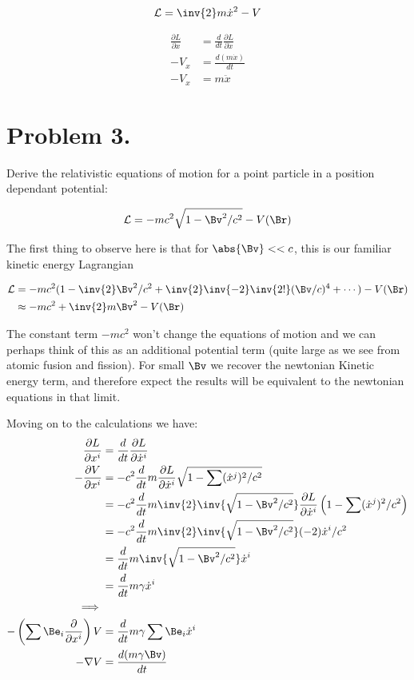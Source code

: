 \documentclass{article}
\newcommand{\grad}[0]{\nabla}
\newcommand{\LL}[0]{\mathcal{L}}
\newcommand{\xdot}[0]{\dot{x}}
\newcommand{\xddot}[0]{\ddot{x}}
\newcommand{\PD}[2]{\frac{\partial {#2}}{\partial {#1}}}
\begin{document}
\begin{equation*}
\LL = \inv{2}m \xdot^2 - V
\end{equation*}

\begin{align*}
\frac{\partial L}{\partial x} &= \frac{d}{dt} \frac{\partial L}{\partial \xdot} \\
-V_x &= \frac{d (m \xdot) }{dt} \\
-V_x &= m \xddot
\end{align*}

\section{ Problem 3. }

Derive the relativistic equations of motion for a point particle in a position dependant potential:

\begin{equation*}
\LL = -m c^2 \sqrt{ 1 - \Bv^2/c^2} - V(\Br)
\end{equation*}

The first thing to observe here is that for $\abs{\Bv} << c$, this is our familiar kinetic energy Lagrangian

\begin{align*}
\LL 
&= -m c^2 ( 1 - \inv{2}\Bv^2/c^2 + \inv{2}\inv{-2}\inv{2!}(\Bv/c)^4 + \cdots ) - V(\Br) \\
&\approx  -m c^2 + \inv{2} m \Bv^2 - V(\Br) \\
\end{align*}

The constant term $-mc^2$ won't change the equations of motion and we can perhaps think of this as an additional potential term (quite large as we see from atomic fusion and fission).  For small $\Bv$ we recover the newtonian Kinetic energy term, and therefore expect the results will be equivalent to the newtonian equations in that limit.

Moving on to the calculations we have:
\begin{align*}
\frac{\partial L}{\partial x^i} &= \frac{d}{dt} \frac{\partial L}{\partial \xdot^i} \\
-\PD{x^i}{V} 
&= -c^2 \frac{d}{dt} m \frac{\partial L}{\partial \xdot^i} \sqrt{ 1 - \sum (\xdot^j)^2/c^2} \\
&= -c^2 \frac{d}{dt} m \inv{2} \inv{ \sqrt{ 1 - \Bv^2/c^2}} \frac{\partial L}{\partial \xdot^i} \left({ 1 - \sum (\xdot^j)^2/c^2}\right) \\
&= -c^2 \frac{d}{dt} m \inv{2} \inv{ \sqrt{ 1 - \Bv^2/c^2}} (-2) \xdot^i/c^2 \\
&= \frac{d}{dt} m \inv{ \sqrt{ 1 - \Bv^2/c^2}} \xdot^i \\
&= \frac{d}{dt} m \gamma \xdot^i \\
\implies \\
- \left(\sum \Be_i \PD{x^i}{}\right) V &= \frac{d}{dt} m \gamma \sum \Be_i \xdot^i \\
- \grad V  &= \frac{d(m \gamma \Bv)}{dt} \\
\end{align*}
\end{document}
